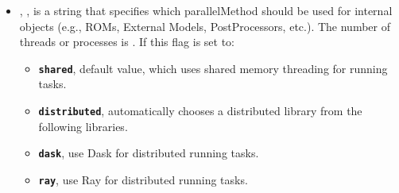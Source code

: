 \begin{itemize}
\item {}, , is a string that specifies which parallelMethod should be used for internal objects (e.g., ROMs, External Models, PostProcessors, etc.).  The number of threads or processes is .
  If this flag is set to:
  \begin{itemize}
  \item  \textbf{\texttt{shared}}, default value, which uses shared memory threading for running tasks.
  \item \textbf{\texttt{distributed}}, automatically chooses a distributed library from the following libraries.
  \item \textbf{\texttt{dask}}, use Dask for distributed running tasks.
  \item \textbf{\texttt{ray}}, use Ray for distributed running tasks.
  \end{itemize}


\end{itemize}

